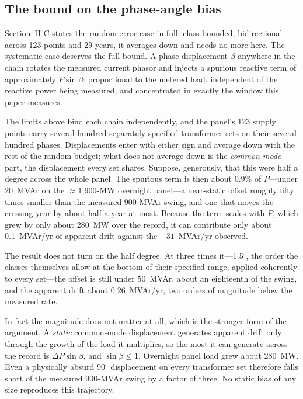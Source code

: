 \documentclass[journal]{IEEEtran}
\begin{document}
\subsection{The bound on the phase-angle bias}
Section~II-C states the random-error case in full: class-bounded, bidirectional
across 123 points and 29 years, it averages down and needs no more here. The
systematic case deserves the full bound. A phase displacement $\beta$ anywhere
in the chain rotates the measured current phasor and injects a spurious
reactive term of approximately $P\sin\beta$: proportional to the metered load,
independent of the reactive power being measured, and concentrated in exactly
the window this paper measures.

The limits above bind each chain independently, and the panel's 123 supply
points carry several hundred separately specified transformer sets on their
several hundred phases. Displacements enter with either sign and average down
with the rest of the random budget; what does not average down is the
\emph{common-mode} part, the displacement every set shares. Suppose,
generously, that this were half a degree across the whole panel. The spurious
term is then about 0.9\% of $P$---under 20~MVAr on the $\approx$1,900-MW
overnight panel---a near-static offset roughly fifty times smaller than the
measured 900-MVAr swing, and one that moves the crossing year by about half a
year at most. Because the term scales with $P$, which grew by only about
280~MW over the record, it can contribute only about 0.1~MVAr/yr of apparent
drift against the $-31$~MVAr/yr observed.

The result does not turn on the half degree. At three times it---1.5$^\circ$,
the order the classes themselves allow at the bottom of their specified range,
applied coherently to every set---the offset is still under 50~MVAr, about an
eighteenth of the swing, and the apparent drift about 0.26~MVAr/yr, two orders
of magnitude below the measured rate.

In fact the magnitude does not matter at all, which is the stronger form of the
argument. A \emph{static} common-mode displacement generates apparent drift
only through the growth of the load it multiplies, so the most it can generate
across the record is $\Delta P\sin\beta$, and $\sin\beta \leq 1$. Overnight
panel load grew about 280~MW. Even a physically absurd 90$^\circ$ displacement
on every transformer set therefore falls short of the measured 900-MVAr swing
by a factor of three. No static bias of any size reproduces this trajectory.
\end{document}
